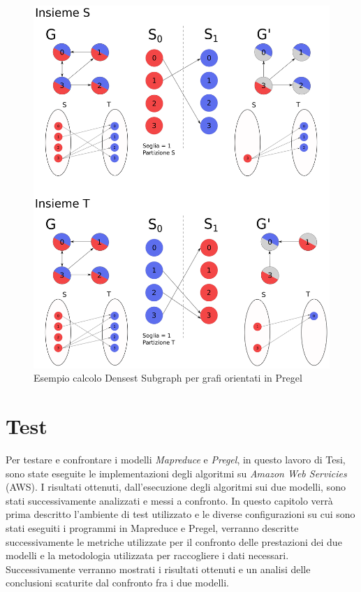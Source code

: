 \documentclass[LaM,binding=0.6cm]{sapthesis}
\begin{document}
\begin{figure}

\centering
 \includegraphics[width=1\textwidth]{PREGEL-denesestD}
\caption{Esempio calcolo Densest Subgraph per grafi orientati in Pregel}
\label{fig:PREGELDENSESESTD}
\end{figure}

\chapter{Test}

Per testare e confrontare i modelli \textit{Mapreduce} e \textit{Pregel}, in questo lavoro di Tesi, sono state eseguite le implementazioni degli algoritmi su \textit{Amazon Web Servicies} (AWS). I risultati ottenuti, dall'esecuzione degli algoritmi sui due modelli, sono stati successivamente analizzati e messi a confronto. 
In questo capitolo verrà prima descritto l'ambiente di test utilizzato e le diverse configurazioni su cui sono stati eseguiti i programmi in Mapreduce e Pregel, verranno descritte successivamente le metriche utilizzate per il confronto delle prestazioni dei due modelli e la metodologia utilizzata per raccogliere i dati necessari. Successivamente verranno mostrati i risultati ottenuti e un analisi delle conclusioni scaturite dal confronto fra i due modelli.
\end{document}
